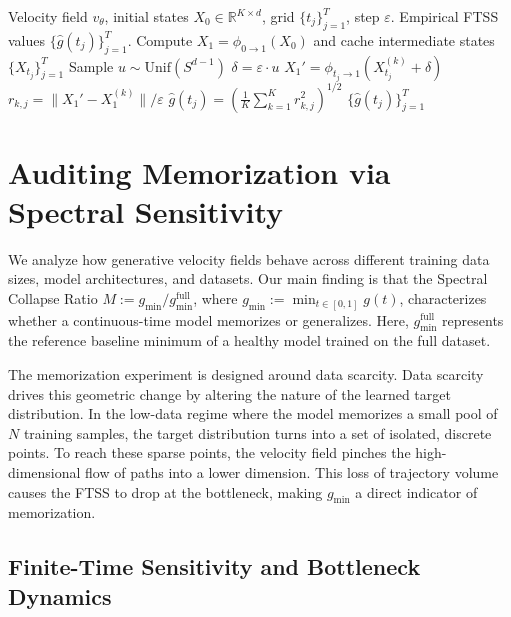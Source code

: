 \documentclass[11pt]{article}
\begin{document}
\begin{algorithm}[htbp]
\caption{Parallel Gradient-Free Estimation of FTSS}
\label{alg:gain}
\begin{algorithmic}[1]
\Require Velocity field $v_\theta$, initial states $X_0 \in \mathbb{R}^{K \times d}$, grid $\{t_j\}_{j=1}^T$, step $\varepsilon$.
\Ensure Empirical FTSS values $\{\hat{g}(t_j)\}_{j=1}^T$.
\State Compute $X_1 = \phi_{0 \to 1}(X_0)$ and cache intermediate states $\{X_{t_j}\}_{j=1}^T$
        \State Sample $u \sim \mathrm{Unif}(S^{d-1})$
        \State $\delta = \varepsilon \cdot u$
        \State $X_1' = \phi_{t_j \to 1}(X_{t_j}^{(k)} + \delta)$
        \State $r_{k,j} = \|X_1' - X_1^{(k)}\| / \varepsilon$
    \EndFor
    \State $\hat{g}(t_j) = \left( \frac{1}{K} \sum_{k=1}^K r_{k,j}^2 \right)^{1/2}$
\EndFor
\State \Return $\{\hat{g}(t_j)\}_{j=1}^{T}$
\end{algorithmic}
\end{algorithm}

\section{Auditing Memorization via Spectral Sensitivity}
\label{sec:bottleneck_framework}

We analyze how generative velocity fields behave across different training data sizes, model architectures, and datasets. Our main finding is that the Spectral Collapse Ratio $M := g_{\min} / g_{\min}^{\text{full}}$, where $g_{\min} := \min_{t \in [0,1]} g(t)$, characterizes whether a continuous-time model memorizes or generalizes. Here, $g_{\min}^{\text{full}}$ represents the reference baseline minimum of a healthy model trained on the full dataset.

The memorization experiment is designed around data scarcity. Data scarcity drives this geometric change by altering the nature of the learned target distribution. In the low-data regime where the model memorizes a small pool of $N$ training samples, the target distribution turns into a set of isolated, discrete points. To reach these sparse points, the velocity field pinches the high-dimensional flow of paths into a lower dimension. This loss of trajectory volume causes the FTSS to drop at the bottleneck, making $g_{\min}$ a direct indicator of memorization.

\subsection{Finite-Time Sensitivity and Bottleneck Dynamics}
\label{sec:bottleneck_dynamics}
\end{document}
